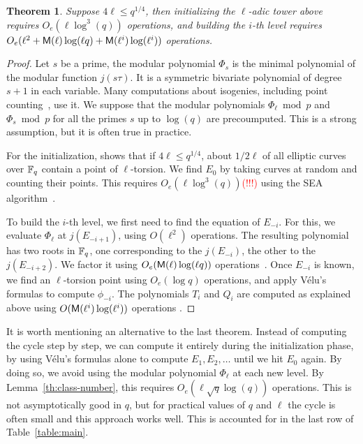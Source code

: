 \documentclass{sig-alternate}
\newtheorem{theorem}[definition]{Theorem}
\newcommand{\todo}[1]{\textcolor{red}{(#1)}}
\begin{document}
\begin{theorem}
  Suppose $4\ell\le q^{1/4}$, then initializing the $\ell$-adic tower
  above requires $O_e(\ell\log^3(q))$ operations, and building the
  $i$-th level requires $O_e(\ell^2+\mathsf{M}(\ell)\log(\ell
  q)+\mathsf{M}(\ell^i)\log(\ell^i))$ operations.
\end{theorem}
\begin{proof}
  Let $s$ be a prime, the modular polynomial $\Phi_s$ is the minimal
  polynomial of the modular function $j(s\tau)$. It is a symmetric
  bivariate polynomial of degree $s+1$ in each variable. Many
  computations about isogenies, including point
  counting~\cite{schoof95}, use it.  We suppose that the modular
  polynomials $\Phi_\ell\bmod p$ and $\Phi_s\bmod p$ for all the
  primes $s$ up to $\log(q)$ are precoumputed. This is a strong
  assumption, but it is often true in practice.

  For the initialization, \cite[Section~4.3]{couveignes+lercier11}
  shows that if $4\ell\le q^{1/4}$, about $1/2\ell$ of all elliptic
  curves over $\mathbb{F}_q$ contain a point of $\ell$-torsion. We find $E_0$
  by taking curves at random and counting their points. This requires
  $O_e(\ell\log^3(q))$\todo{!!!} using the SEA
  algorithm~\cite{schoof95}.

  To build the $i$-th level, we first need to find the equation of
  $E_{-i}$. For this, we evaluate $\Phi_\ell$ at $j(E_{-i+1})$, using
  $O(\ell^2)$ operations. The resulting polynomial has two roots in
  $\mathbb{F}_q$, one corresponding to the $j(E_{-i})$, the other to the
  $j(E_{-i+2})$. We factor it using $O_e(\mathsf{M}(\ell)\log(\ell q))$
  operations~\cite[Ch~14]{vzGG}. Once $E_{-i}$ is known, we find an
  $\ell$-torsion point using $O_e(\log q)$ operations, and apply
  Vélu's formulas to compute $\phi_{-i}$. The polynomials $T_i$ and
  $Q_i$ are computed as explained above using
  $O(\mathsf{M}(\ell^i)\log(\ell^i))$ operations .
\end{proof}

\begin{remark}
  \label{rk:cycle}
  It is worth mentioning an alternative to the last theorem. Instead
  of computing the cycle step by step, we can compute it entirely
  during the initialization phase, by using Vélu's formulas alone to
  compute $E_1,E_2,\dots$ until we hit $E_0$ again. By doing so, we
  avoid using the modular polynomial $\Phi_\ell$ at each new level. By
  Lemma~\ref{th:class-number}, this requires
  $O_e(\ell\sqrt{q}\log(q))$ operations. This is not asymptotically
  good in $q$, but for practical values of $q$ and $\ell$ the cycle is
  often small and this approach works well. This is accounted for in
  the last row of Table~\ref{table:main}.
\end{remark}
\end{document}
